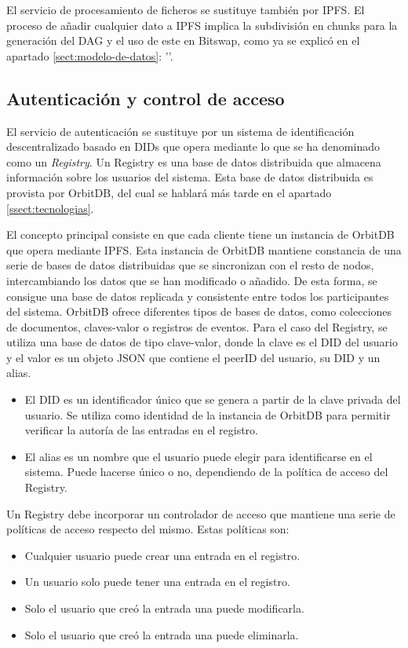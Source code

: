 El servicio de procesamiento de ficheros se sustituye también por IPFS. El proceso de añadir cualquier dato a IPFS implica la subdivisión en chunks
para la generación del DAG y el uso de este en Bitswap, como ya se explicó en el apartado \ref{sect:modelo-de-datos}: ''.

\subsection{Autenticación y control de acceso}\label{ssect:autenticacion}
El servicio de autenticación se sustituye por un sistema de identificación descentralizado basado en DIDs que opera mediante
lo que se ha denominado como un \textit{Registry}. Un Registry es una base de datos distribuida que almacena información sobre los usuarios del sistema.
Esta base de datos distribuida es provista por OrbitDB, del cual se hablará más tarde en el apartado \ref{ssect:tecnologias}.

El concepto principal consiste
en que cada cliente tiene un instancia de OrbitDB que opera mediante IPFS. Esta instancia de OrbitDB mantiene constancia de una serie de bases de datos distribuidas que se sincronizan
con el resto de nodos, intercambiando los datos que se han modificado o añadido. De esta forma, se consigue una base de datos replicada y consistente entre todos los participantes del
sistema. OrbitDB ofrece diferentes tipos de bases de datos, como colecciones de documentos, claves-valor o registros de eventos. Para el caso del Registry, se utiliza una base de
datos de tipo clave-valor, donde la clave es el DID del usuario y el valor es un objeto JSON que contiene el peerID del usuario, su DID y un alias.
\begin{itemize}[noitemsep,after=\vspace{-0.4\baselineskip}]
  \item El DID es un identificador único que se genera a partir de la clave privada del usuario.
        Se utiliza como identidad de la instancia de OrbitDB para permitir verificar la autoría de las entradas en el registro.
  \item El alias es un nombre que el usuario puede elegir para identificarse en el sistema. Puede hacerse único o no, dependiendo de la política de acceso del Registry.
\end{itemize}

Un Registry debe incorporar un controlador de acceso que mantiene una serie de políticas de acceso respecto del mismo.
Estas políticas son:
\begin{itemize}[noitemsep,after=\vspace{-0.4\baselineskip}]
  \item Cualquier usuario puede crear una entrada en el registro.
  \item Un usuario solo puede tener una entrada en el registro.
  \item Solo el usuario que creó la entrada una puede modificarla.
  \item Solo el usuario que creó la entrada una puede eliminarla.
\end{itemize}

